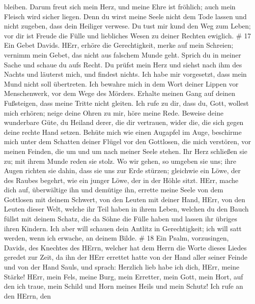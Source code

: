 bleiben.  Darum freut sich mein Herz, und meine Ehre ist
fröhlich; auch mein Fleisch wird sicher liegen.  Denn du
wirst meine Seele nicht dem Tode lassen und nicht zugeben, dass dein
Heiliger verwese.  Du tust mir kund den Weg zum Leben; vor
dir ist Freude die Fülle und liebliches Wesen zu deiner Rechten
ewiglich. \# 17  Ein Gebet Davids. HErr, erhöre die
Gerechtigkeit, merke auf mein Schreien; vernimm mein Gebet, das nicht
aus falschem Munde geht.  Sprich du in meiner Sache und
schaue du aufs Recht.  Du prüfst mein Herz und siehst nach
ihm des Nachts und läuterst mich, und findest nichts. Ich habe mir
vorgesetzt, dass mein Mund nicht soll übertreten.  Ich
bewahre mich in dem Wort deiner Lippen vor Menschenwerk, vor dem Wege
des Mörders.  Erhalte meinen Gang auf deinen Fußsteigen,
dass meine Tritte nicht gleiten.  Ich rufe zu dir, dass du,
Gott, wollest mich erhören; neige deine Ohren zu mir, höre meine Rede.
 Beweise deine wunderbare Güte, du Heiland derer, die dir
vertrauen, wider die, die sich gegen deine rechte Hand setzen.
 Behüte mich wie einen Augapfel im Auge, beschirme mich
unter dem Schatten deiner Flügel  vor den Gottlosen, die
mich verstören, vor meinen Feinden, die um und um nach meiner Seele
stehen.  Ihr Herz schließen sie zu; mit ihrem Munde reden
sie stolz.  Wo wir gehen, so umgeben sie uns; ihre Augen
richten sie dahin, dass sie uns zur Erde stürzen; 
gleichwie ein Löwe, der des Raubes begehrt, wie ein junger Löwe, der in
der Höhle sitzt.  HErr, mache dich auf, überwältige ihn und
demütige ihn, errette meine Seele von dem Gottlosen mit deinem Schwert,
 von den Leuten mit deiner Hand, HErr, von den Leuten
dieser Welt, welche ihr Teil haben in ihrem Leben, welchen du den Bauch
füllst mit deinem Schatz, die da Söhne die Fülle haben und lassen ihr
übriges ihren Kindern.  Ich aber will schauen dein Antlitz
in Gerechtigkeit; ich will satt werden, wenn ich erwache, an deinem
Bilde. \# 18  Ein Psalm, vorzusingen, Davids, des Knechtes
des HErrn, welcher hat dem Herrn die Worte dieses Liedes geredet zur
Zeit, da ihn der HErr errettet hatte von der Hand aller seiner Feinde
und von der Hand Sauls,  und sprach: Herzlich lieb habe ich
dich, HErr, meine Stärke!  HErr, mein Fels, meine Burg, mein
Erretter, mein Gott, mein Hort, auf den ich traue, mein Schild und Horn
meines Heils und mein Schutz!  Ich rufe an den HErrn, den
